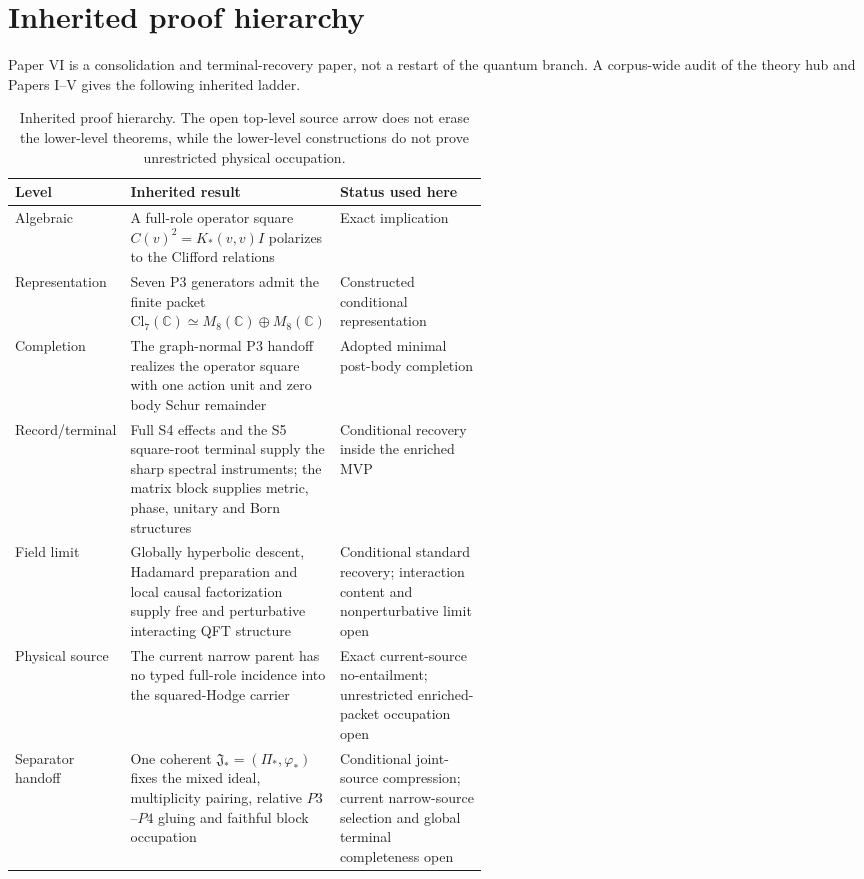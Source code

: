 \documentclass[11pt]{article}
\begin{document}
\section{Inherited proof hierarchy}

Paper VI is a consolidation and terminal-recovery paper, not a restart of the
quantum branch.  A corpus-wide audit of the theory hub and Papers I--V gives
the following inherited ladder.

\begin{table}[h]
\centering
\small
\begin{tabularx}{\linewidth}{>{\raggedright\arraybackslash}p{0.19\linewidth}>{\raggedright\arraybackslash}p{0.36\linewidth}X}
\toprule
Level & Inherited result & Status used here \\
\midrule
Algebraic & A full-role operator square
$C(v)^2=K_*(v,v)I$ polarizes to the Clifford relations & Exact implication \\
Representation & Seven P3 generators admit the finite packet
$\mathrm{Cl}_7(\mathbb C)\simeq M_8(\mathbb C)\oplus M_8(\mathbb C)$ &
Constructed conditional representation \\
Completion & The graph-normal P3 handoff realizes the operator square with
one action unit and zero body Schur remainder & Adopted minimal post-body
completion \\
Record/terminal & Full S4 effects and the S5 square-root terminal supply the
sharp spectral instruments; the matrix block supplies metric, phase, unitary
and Born structures & Conditional recovery inside the enriched MVP \\
Field limit & Globally hyperbolic descent, Hadamard preparation and local
causal factorization supply free and perturbative interacting QFT structure &
Conditional standard recovery; interaction content and nonperturbative limit open \\
Physical source & The current narrow parent has no typed full-role incidence
into the squared-Hodge carrier & Exact current-source no-entailment;
unrestricted enriched-packet occupation open \\
Separator handoff & One coherent $\mathfrak J_*=(\Pi_*,\varphi_*)$ fixes the
mixed ideal, multiplicity pairing, relative $P3$--$P4$ gluing and faithful
block occupation & Conditional joint-source compression; current narrow-source
selection and global terminal completeness open \\
\bottomrule
\end{tabularx}
\caption{Inherited proof hierarchy.  The open top-level source arrow does not
erase the lower-level theorems, while the lower-level constructions do not
prove unrestricted physical occupation.}
\label{tab:inherited}
\end{table}
\end{document}
